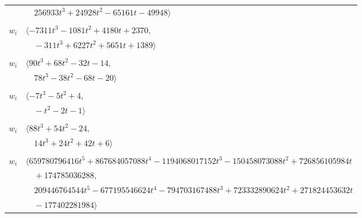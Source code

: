 \documentclass[11pt]{article}
\begin{document}
\begin{longtable}{@{}ll@{}}
 & $\quad 256933t^{3}+24928t^{2}-65161t-49948\rangle$\\
\addlinespace[2pt]
\multicolumn{2}{@{}p{0.97\textwidth}@{}}{$i=61$, $D_i=128$, $\rho_{ij}$: $3{:}2, \allowbreak 7{:}2, \allowbreak 19{:}2, \allowbreak 20{:}1, \allowbreak 51{:}2, \allowbreak 65{:}2, \allowbreak 75{:}2, \allowbreak 77{:}2$}\\
$w_i$ & $\langle -7311t^{3}-1081t^{2}+4180t+2370,$\\
 & $\quad -311t^{3}+6227t^{2}+5651t+1389\rangle$\\
\addlinespace[2pt]
\multicolumn{2}{@{}p{0.97\textwidth}@{}}{$i=62$, $D_i=8$, $\rho_{ij}$: $5{:}2, \allowbreak 22{:}2, \allowbreak 36{:}2, \allowbreak 44{:}1, \allowbreak 49{:}1, \allowbreak 59{:}2, \allowbreak 75{:}2$}\\
$w_i$ & $\langle 90t^{3}+68t^{2}-32t-14,$\\
 & $\quad 78t^{3}-38t^{2}-68t-20\rangle$\\
\addlinespace[2pt]
\multicolumn{2}{@{}p{0.97\textwidth}@{}}{$i=63$, $D_i=4$, $\rho_{ij}$: $1{:}1, \allowbreak 12{:}1, \allowbreak 39{:}2, \allowbreak 49{:}2, \allowbreak 56{:}1, \allowbreak 65{:}2$}\\
$w_i$ & $\langle -7t^{3}-5t^{2}+4,$\\
 & $\quad -t^{2}-2t-1\rangle$\\
\addlinespace[2pt]
\multicolumn{2}{@{}p{0.97\textwidth}@{}}{$i=64$, $D_i=8$, $\rho_{ij}$: $3{:}1, \allowbreak 15{:}1, \allowbreak 25{:}2, \allowbreak 31{:}2, \allowbreak 43{:}1, \allowbreak 46{:}2, \allowbreak 47{:}1, \allowbreak 48{:}1$}\\
$w_i$ & $\langle 88t^{3}+54t^{2}-24,$\\
 & $\quad 14t^{3}+24t^{2}+42t+6\rangle$\\
\addlinespace[2pt]
\multicolumn{2}{@{}p{0.97\textwidth}@{}}{$i=65$, $D_i=16777216$, $\rho_{ij}$: $3{:}2, \allowbreak 4{:}1, \allowbreak 10{:}1, \allowbreak 12{:}2, \allowbreak 13{:}2, \allowbreak 29{:}1, \allowbreak 34{:}1, \allowbreak 46{:}2, \allowbreak 56{:}2, \allowbreak 60{:}2, \allowbreak 61{:}1, \allowbreak 63{:}1, \allowbreak 70{:}2, \allowbreak 75{:}2$}\\
$w_i$ & $\langle 659780796416t^{5}+867684057088t^{4}-1194068017152t^{3}-150458073088t^{2}+726856105984t$\\
 & $\quad +174785036288,$\\
 & $\quad 209446764544t^{5}-677195546624t^{4}-794703167488t^{3}+723332890624t^{2}+271824453632t$\\
 & $\quad -177402281984\rangle$\\

\end{longtable}
\end{document}
